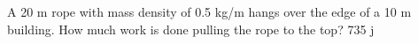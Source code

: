 {A 20 m rope with mass density of 0.5 kg/m hangs over the edge of a 10 m building. How much work is done pulling the rope to the top?}
{735 j}
